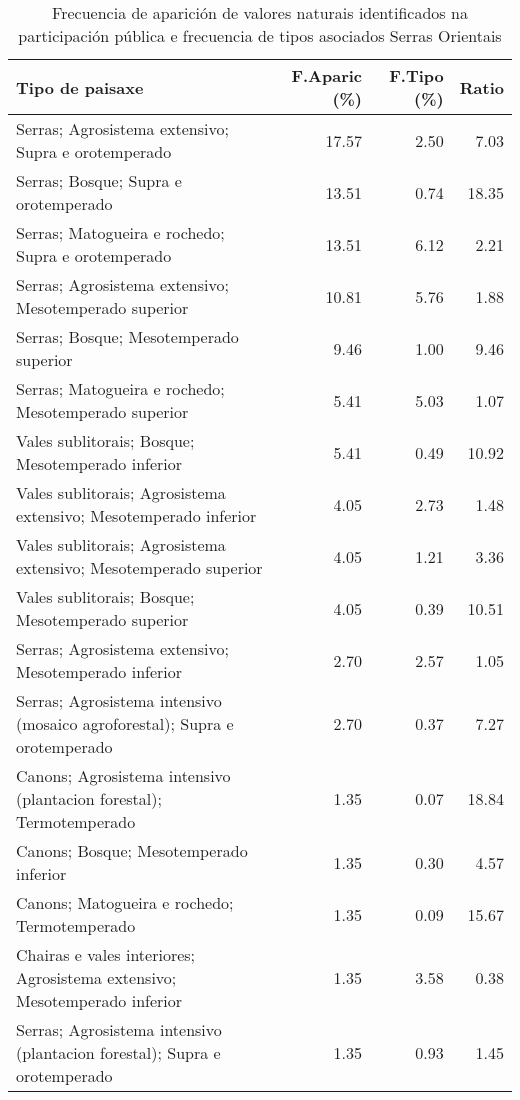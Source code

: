 \begin{table}[p]
\centering
\caption{Frecuencia de aparición de valores naturais identificados na participación pública e frecuencia de tipos asociados Serras Orientais} 
\label{vsixotnat5}
\begin{tabular}{lrrr}
  \hline
Tipo de paisaxe & F.Aparic (\%) & F.Tipo (\%) & Ratio \\ 
  \hline
Serras; Agrosistema extensivo; Supra e orotemperado & 17.57 & 2.50 & 7.03 \\ 
  Serras; Bosque; Supra e orotemperado & 13.51 & 0.74 & 18.35 \\ 
  Serras; Matogueira e rochedo; Supra e orotemperado & 13.51 & 6.12 & 2.21 \\ 
  Serras; Agrosistema extensivo; Mesotemperado superior & 10.81 & 5.76 & 1.88 \\ 
  Serras; Bosque; Mesotemperado superior & 9.46 & 1.00 & 9.46 \\ 
  Serras; Matogueira e rochedo; Mesotemperado superior & 5.41 & 5.03 & 1.07 \\ 
  Vales sublitorais; Bosque; Mesotemperado inferior & 5.41 & 0.49 & 10.92 \\ 
  Vales sublitorais; Agrosistema extensivo; Mesotemperado inferior & 4.05 & 2.73 & 1.48 \\ 
  Vales sublitorais; Agrosistema extensivo; Mesotemperado superior & 4.05 & 1.21 & 3.36 \\ 
  Vales sublitorais; Bosque; Mesotemperado superior & 4.05 & 0.39 & 10.51 \\ 
  Serras; Agrosistema extensivo; Mesotemperado inferior & 2.70 & 2.57 & 1.05 \\ 
  Serras; Agrosistema intensivo (mosaico agroforestal); Supra e orotemperado & 2.70 & 0.37 & 7.27 \\ 
  Canons; Agrosistema intensivo (plantacion forestal); Termotemperado & 1.35 & 0.07 & 18.84 \\ 
  Canons; Bosque; Mesotemperado inferior & 1.35 & 0.30 & 4.57 \\ 
  Canons; Matogueira e rochedo; Termotemperado & 1.35 & 0.09 & 15.67 \\ 
  Chairas e vales interiores; Agrosistema extensivo; Mesotemperado inferior & 1.35 & 3.58 & 0.38 \\ 
  Serras; Agrosistema intensivo (plantacion forestal); Supra e orotemperado & 1.35 & 0.93 & 1.45 \\ 
   \hline
\end{tabular}
\end{table}
